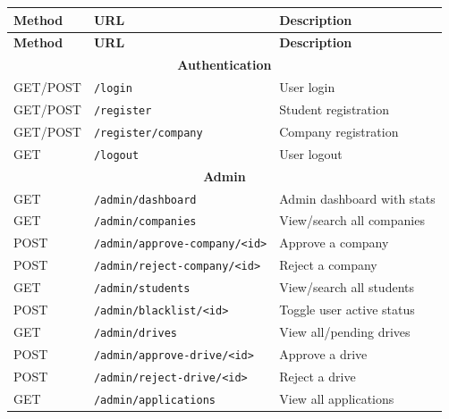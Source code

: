 \documentclass[12pt,a4paper]{article}
\begin{document}
\begin{longtable}{|l|l|p{5.5cm}|}
\hline
\textbf{Method} & \textbf{URL} & \textbf{Description} \\ \hline
\endfirsthead
\hline \textbf{Method} & \textbf{URL} & \textbf{Description} \\ \hline
\endhead

\multicolumn{3}{|c|}{\textbf{Authentication}} \\ \hline
GET/POST & \texttt{/login}              & User login                    \\ \hline
GET/POST & \texttt{/register}           & Student registration          \\ \hline
GET/POST & \texttt{/register/company}   & Company registration          \\ \hline
GET      & \texttt{/logout}             & User logout                   \\ \hline

\multicolumn{3}{|c|}{\textbf{Admin}} \\ \hline
GET      & \texttt{/admin/dashboard}    & Admin dashboard with stats    \\ \hline
GET      & \texttt{/admin/companies}    & View/search all companies     \\ \hline
POST     & \texttt{/admin/approve-company/<id>} & Approve a company    \\ \hline
POST     & \texttt{/admin/reject-company/<id>}  & Reject a company     \\ \hline
GET      & \texttt{/admin/students}     & View/search all students      \\ \hline
POST     & \texttt{/admin/blacklist/<id>}& Toggle user active status    \\ \hline
GET      & \texttt{/admin/drives}       & View all/pending drives       \\ \hline
POST     & \texttt{/admin/approve-drive/<id>}   & Approve a drive      \\ \hline
POST     & \texttt{/admin/reject-drive/<id>}    & Reject a drive       \\ \hline
GET      & \texttt{/admin/applications} & View all applications         \\ \hline


\end{longtable}
\end{document}
